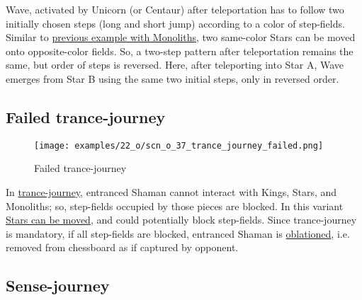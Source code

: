 \vspace*{-0.5\baselineskip}
Wave, activated by Unicorn (or Centaur) after teleportation has to follow two initially
chosen steps (long and short jump) according to a color of step-fields. Similar to
\hyperref[fig:scn_d_19_steps_after_teleport_init]{previous example with Monoliths},
two same-color Stars can be moved onto opposite-color fields. So, a two-step pattern
after teleportation remains the same, but order of steps is reversed. Here, after
teleporting into Star A, Wave emerges from Star B using the same two initial steps,
only in reversed order.

\clearpage %

\subsection*{Failed trance-journey}
\label{sec:One/Starchild/Failed trance-journey}

\vspace*{-1.5\baselineskip}
\noindent
\begin{figure}[!h]
\texttt{[image: examples/22\_o/scn\_o\_37\_trance\_journey\_failed.png]}
\vspace*{-1.4\baselineskip}
\caption{Failed trance-journey}
\label{fig:scn_o_37_trance_journey_failed}
\end{figure}

\vspace*{-0.5\baselineskip}
In \hyperref[fig:scn_cot_082_light_shaman_trance_journey]{trance-journey}, entranced
Shaman cannot interact with Kings, Stars, and Monoliths; so, step-fields occupied by
those pieces are blocked. In this variant
\hyperref[fig:scn_o_09_starchild_moving_star_init]{Stars can be moved}, and could
potentially block step-fields. Since trance-journey is mandatory, if all step-fields
are blocked, entranced Shaman is \hyperref[sec:Terms/Oblation]{oblationed}, i.e.
removed from chessboard as if captured by opponent.

\clearpage %

\subsection*{Sense-journey}
\label{sec:One/Starchild/Sense-journey}

